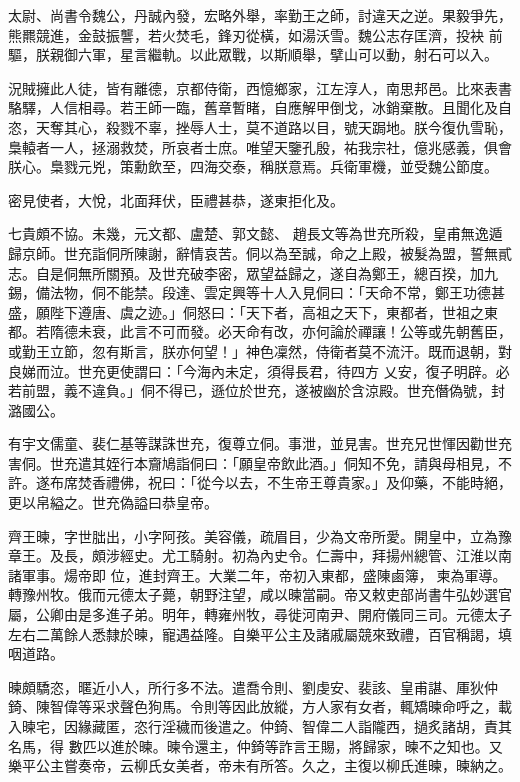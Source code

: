 \begin{pinyinscope}
 太尉、尚書令魏公，丹誠內發，宏略外舉，率勤王之師，討違天之逆。果毅爭先，熊羆競進，金鼓振讋，若火焚毛，鋒刃從橫，如湯沃雪。魏公志存匡濟，投袂
 前驅，朕親御六軍，星言繼軌。以此眾戰，以斯順舉，擘山可以動，射石可以入。



 況賊擁此人徒，皆有離德，京都侍衛，西憶鄉家，江左淳人，南思邦邑。比來表書駱驛，人信相尋。若王師一臨，舊章暫睹，自應解甲倒戈，冰銷棄散。且聞化及自恣，天奪其心，殺戮不辜，挫辱人士，莫不道路以目，號天跼地。朕今復仇雪恥，梟轅者一人，拯溺救焚，所哀者士庶。唯望天鑒孔殷，祐我宗社，億兆感義，俱會朕心。梟戮元兇，策勳飲至，四海交泰，稱朕意焉。兵衛軍機，並受魏公節度。



 密見使者，大悅，北面拜伏，臣禮甚恭，遂東拒化及。



 七貴頗不協。未幾，元文都、盧楚、郭文懿、
 趙長文等為世充所殺，皇甫無逸遁歸京師。世充詣侗所陳謝，辭情哀苦。侗以為至誠，命之上殿，被髮為盟，誓無貳志。自是侗無所關預。及世充破李密，眾望益歸之，遂自為鄭王，總百揆，加九錫，備法物，侗不能禁。段達、雲定興等十人入見侗曰：「天命不常，鄭王功德甚盛，願陛下遵唐、虞之迹。」侗怒曰：「天下者，高祖之天下，東都者，世祖之東都。若隋德未衰，此言不可而發。必天命有改，亦何論於禪讓！公等或先朝舊臣，或勤王立節，忽有斯言，朕亦何望！」神色凜然，侍衛者莫不流汗。既而退朝，對良娣而泣。世充更使謂曰：「今海內未定，須得長君，待四方
 乂安，復子明辟。必若前盟，義不違負。」侗不得已，遜位於世充，遂被幽於含涼殿。世充僭偽號，封潞國公。



 有宇文儒童、裴仁基等謀誅世充，復尊立侗。事泄，並見害。世充兄世惲因勸世充害侗。世充遣其姪行本齎鳩詣侗曰：「願皇帝飲此酒。」侗知不免，請與母相見，不許。遂布席焚香禮佛，祝曰：「從今以去，不生帝王尊貴家。」及仰藥，不能時絕，更以帛縊之。世充偽謚曰恭皇帝。



 齊王暕，字世朏出，小字阿孩。美容儀，疏眉目，少為文帝所愛。開皇中，立為豫章王。及長，頗涉經史。尤工騎射。初為內史令。仁壽中，拜揚州總管、江淮以南諸軍事。煬帝即
 位，進封齊王。大業二年，帝初入東都，盛陳鹵簿，柬為軍導。轉豫州牧。俄而元德太子薨，朝野注望，咸以暕當嗣。帝又敕吏部尚書牛弘妙選官屬，公卿由是多進子弟。明年，轉雍州牧，尋徙河南尹、開府儀同三司。元德太子左右二萬餘人悉隸於暕，寵遇益隆。自樂平公主及諸戚屬競來致禮，百官稱謁，填咽道路。



 暕頗驕恣，暱近小人，所行多不法。遣喬令則、劉虔安、裴該、皇甫諶、厙狄仲錡、陳智偉等采求聲色狗馬。令則等因此放縱，方人家有女者，輒矯暕命呼之，載入暕宅，因緣藏匿，恣行淫穢而後遣之。仲錡、智偉二人詣隴西，撾炙諸胡，責其名馬，得
 數匹以進於暕。暕令還主，仲錡等詐言王賜，將歸家，暕不之知也。又樂平公主嘗奏帝，云柳氏女美者，帝未有所答。久之，主復以柳氏進暕，暕納之。




\end{pinyinscope}
